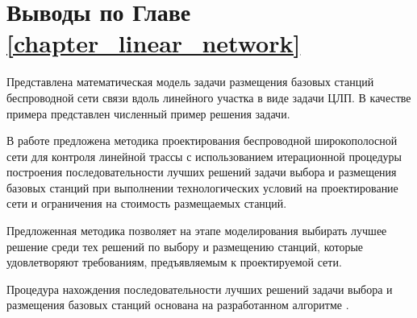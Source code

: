 \section{Выводы по Главе \cref{chapter_linear_network}}
Представлена математическая модель задачи размещения базовых станций беспроводной сети связи вдоль линейного участка в виде задачи ЦЛП. В качестве примера представлен численный пример решения задачи.


В работе предложена методика проектирования беспроводной широкополосной сети для контроля линейной трассы с использованием итерационной процедуры построения последовательности лучших решений задачи выбора и размещения базовых станций при выполнении технологических условий на проектирование сети и ограничения на стоимость размещаемых станций. 

Предложенная методика позволяет на этапе моделирования выбирать лучшее решение среди тех решений по выбору и размещению станций, которые удовлетворяют требованиям, предъявляемым к проектируемой сети.

Процедура нахождения последовательности лучших решений задачи выбора и размещения базовых станций основана на разработанном алгоритме .








